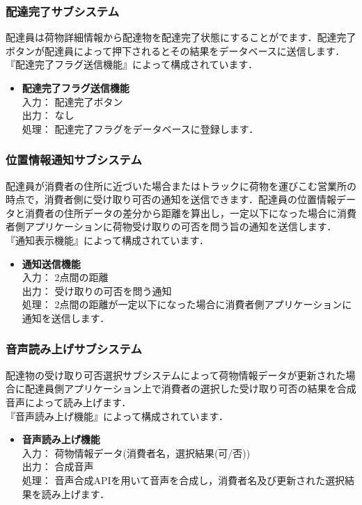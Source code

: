 \documentclass[a4j,titlepage]{jarticle}
\begin{document}
\subsubsection{配達完了サブシステム}
配達員は荷物詳細情報から配達物を配達完了状態にすることがでます．配達完了ボタンが配達員によって押下されるとその結果をデータベースに送信します．\\
『配達完了フラグ送信機能』によって構成されています．
\begin{itemize}
\item \textbf{配達完了フラグ送信機能} \\
入力： 配達完了ボタン\\
出力： なし \\
処理： 配達完了フラグをデータベースに登録します．
\end{itemize}

\subsubsection{位置情報通知サブシステム}
配達員が消費者の住所に近づいた場合またはトラックに荷物を運びこむ営業所の時点で，消費者側に受け取り可否の通知を送信できます．配達員の位置情報データと消費者の住所データの差分から距離を算出し，一定以下になった場合に消費者側アプリケーションに荷物受け取りの可否を問う旨の通知を送信します．\\
『通知表示機能』によって構成されています．
\begin{itemize}
\item \textbf{通知送信機能} \\
入力： 2点間の距離 \\
出力： 受け取りの可否を問う通知 \\
処理： 2点間の距離が一定以下になった場合に消費者側アプリケーションに通知を送信します．
\end{itemize}

\subsubsection{音声読み上げサブシステム}
配達物の受け取り可否選択サブシステムによって荷物情報データが更新された場合に配達員側アプリケーション上で消費者の選択した受け取り可否の結果を合成音声によって読み上げます． \\
『音声読み上げ機能』によって構成されています．
\begin{itemize}
\item \textbf{音声読み上げ機能} \\
入力： 荷物情報データ(消費者名，選択結果(可/否)) \\
出力： 合成音声\\
処理： 音声合成APIを用いて音声を合成し，消費者名及び更新された選択結果を読み上げます．
\end{itemize}
\end{document}
